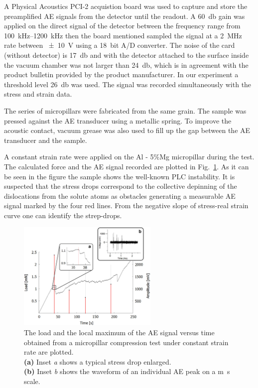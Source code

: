 A Physical Acoustics PCI-2 acquistion board was used to capture and store the preamplified AE signals from the detector until the readout. A \SI{60}{\decibel} gain was applied on the direct signal of the detector between the frequency range from \SIrange{100}{1200}{kHz} then the board mentioned sampled the signal at a \SI{2}{MHz} rate between \SI{\pm 10}{V} using a \SI{18}{bit} A/D converter. The noise of the card (without detector) is \SI{17}{\decibel} and with the detector attached to the surface inside the vacuum chamber was not larger than \SI{24}{\decibel}, which is in agreement with the product bulletin provided by the product manufacturer. In our experiment a threshold level \SI{26}{\decibel} was used. The signal was recorded simultaneously with the stress and strain data.

The series of micropillars were fabricated from the same grain. The sample was pressed against the AE transducer using a metallic spring. To improve the acoustic contact, vacuum grease was also used to fill up the gap between the AE transducer and the sample.

A constant 	 strain rate were applied on the Al - 5\%Mg micropillar during the test. The calculated force and the AE signal recorded are plotted in Fig.~\ref{fig:loadAE_time}. As it can be seen in the figure the sample shows the well-known PLC instability. It is suspected that the stress drops correspond to the collective depinning of the dislocations from the solute atoms as obstacles generating a measurable AE signal marked by the four red lines. From  the negative slope of stress-real strain curve one can identify the strep-drops.

\begin{figure}[htbp!] 
\centering    
\includegraphics[width=0.6\textwidth]{Micron-Scale_Deformation3}
\caption[Load curve and AE signals]{The load and the local maximum of the AE signal versus time obtained from a micropillar compression test under constant strain rate are plotted.\\
\textbf{(a)} Inset \textit{a} shows a typical stress drop enlarged.\\
\textbf{(b)} Inset \textit{b} shows the waveform of an individual AE peak on a \si{m\second} scale.}
\label{fig:loadAE_time}
\end{figure}


